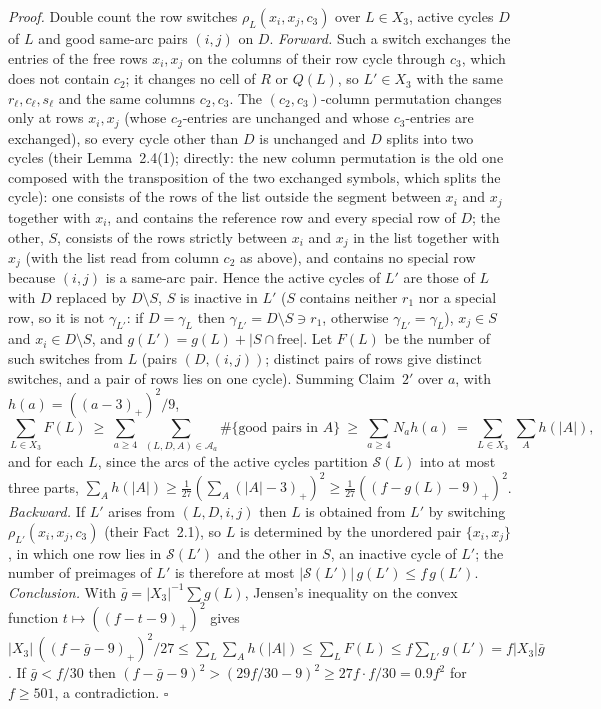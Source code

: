 \emph{Proof.}  Double count the row switches $\rho_L(x_i,x_j,c_3)$ over
$L\in X_3$, active cycles $D$ of $L$ and good same-arc pairs $(i,j)$ on
$D$.  \emph{Forward.}  Such a switch exchanges the entries of the free
rows $x_i,x_j$ on the columns of their row cycle through $c_3$, which
does not contain $c_2$; it changes no cell of $R$ or $Q(L)$, so
$L'\in X_3$ with the same $r_\ell,c_\ell,s_\ell$ and the same columns
$c_2,c_3$.  The $(c_2,c_3)$-column permutation changes only at rows
$x_i,x_j$ (whose $c_2$-entries are unchanged and whose $c_3$-entries
are exchanged), so every cycle other than $D$ is unchanged and $D$
splits into two cycles (their Lemma~2.4(1); directly: the new column
permutation is the old one composed with the transposition of the two
exchanged symbols, which splits the cycle): one consists of the rows of
the list outside the segment between $x_i$ and $x_j$ together with
$x_i$, and contains the reference row and every special row of $D$;
the other, $S$, consists of the rows strictly between $x_i$ and $x_j$
in the list together with $x_j$ (with the list read from column $c_2$
as above), and contains no special row because $(i,j)$ is a same-arc
pair.  Hence the active
cycles of $L'$ are those of $L$ with $D$ replaced by $D\setminus S$,
$S$ is inactive in $L'$ ($S$ contains neither $r_1$ nor a special row,
so it is not $\gamma_{L'}$: if $D=\gamma_L$ then $\gamma_{L'}=D\setminus S\ni r_1$,
otherwise $\gamma_{L'}=\gamma_L$), $x_j\in S$ and $x_i\in D\setminus S$,
and $g(L')=g(L)+|S\cap\text{free}|$.  Let $F(L)$ be the number of such
switches from $L$ (pairs $(D,(i,j))$; distinct pairs of rows give
distinct switches, and a pair of rows lies on one cycle).  Summing
Claim~$2'$ over $a$, with $h(a)=((a-3)_+)^2/9$,
\[
\sum_{L\in X_3}F(L)\ \ge\ \sum_{a\ge4}\ \sum_{(L,D,A)\in\mathcal A_a}\#\{\text{good pairs in }A\}
\ \ge\ \sum_{a\ge4}N_ah(a)\ =\ \sum_{L\in X_3}\ \sum_{A}h(|A|),
\]
and for each $L$, since the arcs of the active cycles partition
$\mathcal S(L)$ into at most three parts,
$\sum_Ah(|A|)\ge\frac1{27}(\sum_A(|A|-3)_+)^2\ge\frac1{27}((f-g(L)-9)_+)^2$.
\emph{Backward.}  If $L'$ arises from $(L,D,i,j)$ then $L$ is obtained
from $L'$ by switching $\rho_{L'}(x_i,x_j,c_3)$ (their Fact~2.1), so
$L$ is determined by the unordered pair $\{x_i,x_j\}$, in which one
row lies in $\mathcal S(L')$ and the other in $S$, an inactive cycle
of $L'$; the number of preimages of $L'$ is therefore at most
$|\mathcal S(L')|\,g(L')\le f\,g(L')$.  \emph{Conclusion.}  With
$\bar g=|X_3|^{-1}\sum g(L)$, Jensen's inequality on the convex function
$t\mapsto((f-t-9)_+)^2$ gives
$|X_3|\,((f-\bar g-9)_+)^2/27\le\sum_L\sum_Ah(|A|)\le\sum_LF(L)\le f\sum_{L'}g(L')=f|X_3|\bar g$.
If $\bar g<f/30$ then $(f-\bar g-9)^2>(29f/30-9)^2\ge27f\cdot f/30=0.9f^2$
for $f\ge501$, a contradiction.  $\square$

